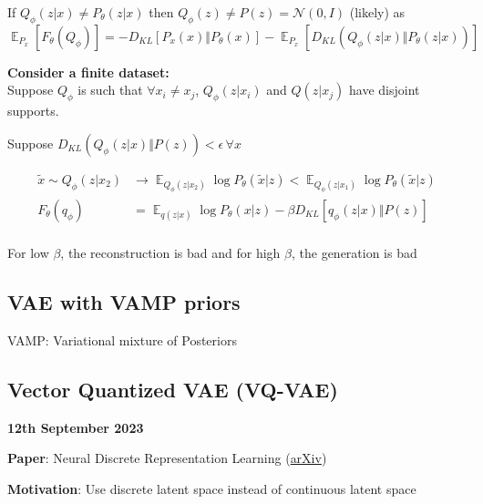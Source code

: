 \documentclass[11pt]{article}
\DeclareMathOperator*{\E}{\mathbb{E}}
\begin{document}
If $Q_{\phi}(z|x) \not = P_{\theta}(z|x)$ then $Q_{\phi}(z) \not = P(z) = \mathcal{N}(0, I)$ (likely)
as \\
$\E_{P_x}\left[ F_{\theta}(Q_{\phi}) \right] = -D_{KL}\left[ P_x(x) \Vert P_{\theta}(x) \right] - \E_{P_x} \left[ D_{KL} (Q_{\phi}(z|x) \Vert P_{\theta}(z|x)) \right]$

\vspace{1em}
\textbf{Consider a finite dataset:} \\
Suppose $Q_{\phi}$ is such that $\forall x_i \not = x_j$, $Q_{\phi}(z|x_i)$ and $Q(z|x_j)$ have disjoint supports.

Suppose $D_{KL}(Q_{\phi}(z|x) \Vert P(z)) < \epsilon\, \forall x$ 


\begin{minipage}{0.70\textwidth}
  \begin{align*}
    \tilde{x} \sim Q_{\phi}(z|x_2) &\rightarrow \E_{Q_{\phi}(z|x_2)}\log P_{\theta}(\tilde{x}|z)
                                     < \E_{Q_{\phi}(z|x_1)}\log P_{\theta}(\tilde{x}|z) \\
    F_{\theta}(q_{\phi}) &= \E_{q(z|x)} \log P_{\theta}(x | z)
                           - \beta D_{KL} \left[ q_{\phi}(z|x) \Vert P(z) \right]  \\
  \end{align*}
\end{minipage}
\begin{minipage}{0.30\textwidth}
\end{minipage}


For low $\beta$, the reconstruction is bad and for high $\beta$, the generation is bad

\subsection{VAE with VAMP priors}

VAMP: Variational mixture of Posteriors

\subsection{Vector Quantized VAE (VQ-VAE)}

\textbf{12th September 2023}

\textbf{Paper}: Neural Discrete Representation Learning   (\href{https://arxiv.org/abs/1711.00937}{arXiv})

\textbf{Motivation}: Use discrete latent space instead of continuous latent space
\end{document}
